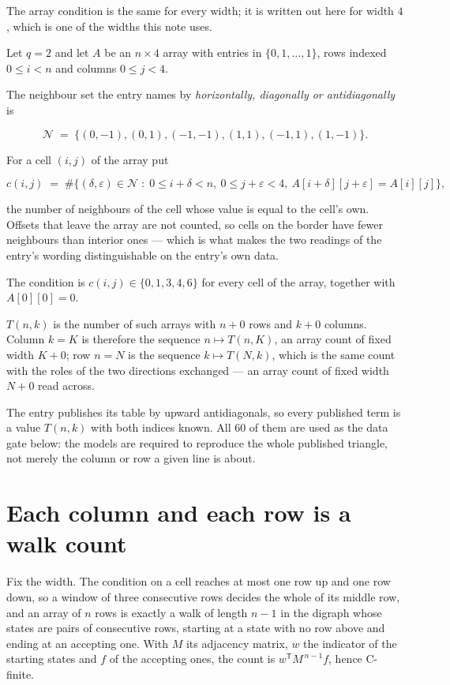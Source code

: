 \documentclass[11pt]{article}
\theoremstyle{definition}
\begin{document}
The array condition is the same for every width; it is written out here for width $4$, which is one of the widths this note uses.

Let $q = 2$ and let $A$ be an $n \times 4$ array with entries in $\{0,1,\dots,1\}$, rows indexed $0 \le i < n$ and columns $0 \le j < 4$.

The neighbour set the entry names by {\itshape horizontally, diagonally or antidiagonally} is

\[\mathcal{N} \;=\; \{(0,-1), (0,1), (-1,-1), (1,1), (-1,1), (1,-1)\}.\]

For a cell $(i,j)$ of the array put

\[c(i,j) \;=\; \#\bigl\{(\delta,\varepsilon)\in\mathcal{N} \;:\; 0\le i+\delta<n,\ 0\le j+\varepsilon<4,\ A[i+\delta][j+\varepsilon] = A[i][j]\bigr\},\]

the number of neighbours of the cell whose value is equal to the cell's own. Offsets that leave the array are not counted, so cells on the border have fewer neighbours than interior ones --- which is what makes the two readings of the entry's wording distinguishable on the entry's own data.

The condition is $c(i,j) \in \{0, 1, 3, 4, 6\}$ for every cell of the array, together with $A[0][0]=0$.

$T(n,k)$ is the number of such arrays with $n + 0$ rows and $k + 0$ columns. Column $k = K$ is therefore the sequence $n \mapsto T(n,K)$, an array count of fixed width $K + 0$; row $n = N$ is the sequence $k \mapsto T(N,k)$, which is the same count with the roles of the two directions exchanged --- an array count of fixed width $N + 0$ read across.

The entry publishes its table by upward antidiagonals, so every published term is a value $T(n,k)$ with both indices known. All 60 of them are used as the data gate below: the models are required to reproduce the whole published triangle, not merely the column or row a given line is about.

\section{Each column and each row is a walk count}

Fix the width. The condition on a cell reaches at most one row up and one row down, so a window of three consecutive rows decides the whole of its middle row, and an array of $n$ rows is exactly a walk of length $n-1$ in the digraph whose states are pairs of consecutive rows, starting at a state with no row above and ending at an accepting one. With $M$ its adjacency matrix, $w$ the indicator of the starting states and $f$ of the accepting ones, the count is $w^{\mathsf T}M^{\,n-1}f$, hence C-finite.
\end{document}
